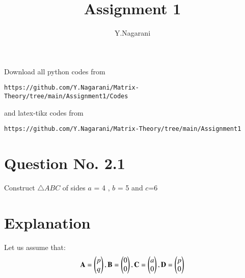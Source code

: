\documentclass[journal,12pt,twocolumn]{IEEEtran}
\begin{document}
     \def\rightbox#1{\makebox[0in][r]{#1}}
     \def\centbox#1{\makebox[0in]{#1}}
     \def\topbox#1{\raisebox{-\baselineskip}[0in][0in]{#1}}
     \def\midbox#1{\raisebox{-0.5\baselineskip}[0in][0in]{#1}}
\vspace{3cm}
\title{Assignment 1}
\author{Y.Nagarani}
\maketitle
\newpage
\bigskip
\renewcommand{\thefigure}{\theenumi}
\renewcommand{\thetable}{\theenumi}
Download all python codes from 
\begin{lstlisting}
https://github.com/Y.Nagarani/Matrix-Theory/tree/main/Assignment1/Codes
\end{lstlisting}
%
and latex-tikz codes from 
%
\begin{lstlisting}
https://github.com/Y.Nagarani/Matrix-Theory/tree/main/Assignment1
\end{lstlisting}
%
\section{Question No. 2.1}
Construct $\triangle ABC$  of   sides
$a$ = 4 , $b$ = 5  and $c$=6
%
\section{Explanation}
Let us assume that:
\begin{align}
\label{eq:tri_basic}
\mathbf{A} = \begin{pmatrix}p\\q\end{pmatrix}, \mathbf{B} = \begin{pmatrix}0\\0\end{pmatrix}, \mathbf{C} = \begin{pmatrix}a\\0\end{pmatrix}, \mathbf{D} = \begin{pmatrix}p\\0\end{pmatrix}
\end{align}
%
\end{document}
